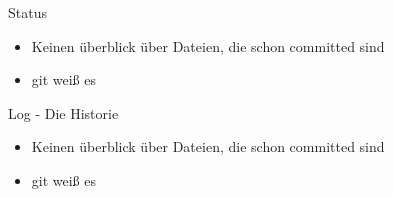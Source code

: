 \documentclass{beamer}
\begin{document}
  \begin{frame}{Status}
        \begin{itemize}[<+->]
          \item Keinen überblick über Dateien, die schon committed sind
          \item git weiß es
        \end{itemize}
  \end{frame}

  \begin{frame}{Log - Die Historie}
        \begin{itemize}[<+->]
          \item Keinen überblick über Dateien, die schon committed sind
          \item git weiß es
        \end{itemize}
  \end{frame}
\end{document}

